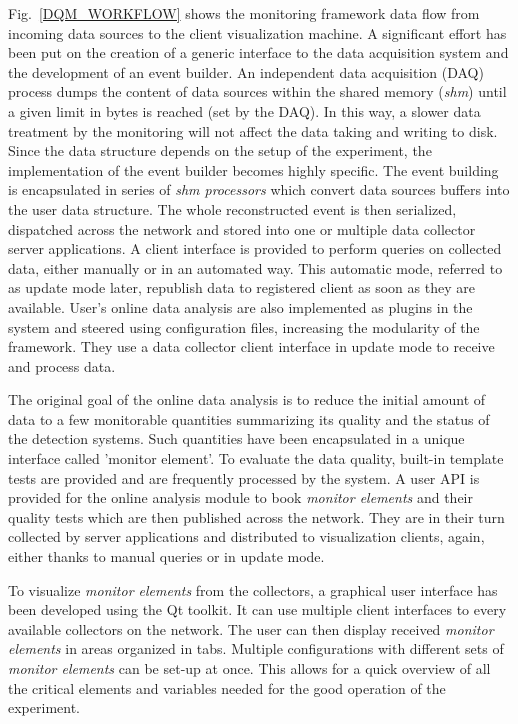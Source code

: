 \documentclass[conference]{IEEEtran}
\begin{document}
Fig.~\ref{DQM_WORKFLOW} shows the monitoring framework data flow from incoming data sources to the client visualization machine. A significant effort has been put on the creation of a generic interface to the data acquisition system and the development of an event builder. An independent data acquisition (DAQ) process dumps the content of data sources within the shared memory (\textit{shm}) until a given limit in bytes is reached (set by the DAQ). In this way, a slower data treatment by the monitoring will not affect the data taking and writing to disk. Since the data structure depends on the setup of the experiment, the implementation of the event builder becomes highly specific. The event building is encapsulated in series of \textit{shm processors} which convert data sources buffers into the user data structure. The whole reconstructed event is then serialized, dispatched across the network and stored into one or multiple data collector server applications.
A client interface is provided to perform queries on collected data, either manually or in an automated way. This automatic mode, referred to as update mode later, republish data to registered client as soon as they are available.
User's online data analysis are also implemented as plugins in the system and steered using configuration files, increasing the modularity of the framework. They use a data collector client interface in update mode to receive and process data.

The original goal of the online data analysis is to reduce the initial amount of data to a few monitorable quantities summarizing its quality and the status of the detection systems. Such quantities have been encapsulated in a unique interface called 'monitor element'. To evaluate the data quality, built-in template tests are provided and are frequently processed by the system. A user API is provided for the online analysis module to book \textit{monitor elements} and their quality tests which are then published across the network. They are in their turn collected by server applications and distributed to visualization clients, again, either thanks to manual queries or in update mode.

To visualize \textit{monitor elements} from the collectors, a graphical user interface has been developed using the Qt\cite{QT} toolkit. It can use multiple client interfaces to every available collectors on the network. The user can then display received \textit{monitor elements} in areas organized in tabs. Multiple configurations with different sets of \textit{monitor elements} can be set-up at once. This allows for a quick overview of all the critical elements and variables needed for the good operation of the experiment.
\end{document}
